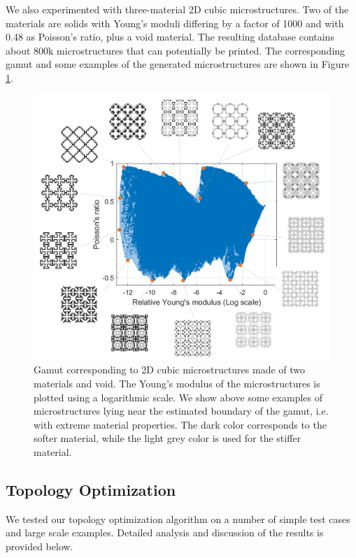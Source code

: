 We also experimented with three-material 2D cubic microstructures.
Two of the materials are solids with Young's moduli differing by a factor of 1000 and with 0.48 as Poisson's ratio, plus a void material.
The resulting database contains about 800k microstructures that can potentially be printed.
The corresponding gamut and some examples of the generated microstructures are shown in Figure \ref{fig:Cubic2D_3Materials}.
\begin{figure}
	\centering
	\includegraphics[width=.5\linewidth]{images/Cubic2D_3Materials.png}
	\caption{Gamut corresponding to 2D cubic microstructures made of two materials and void. The Young's modulus of the microstructures is plotted using a logarithmic scale. We show above some examples of microstructures lying near the estimated boundary of the gamut, i.e. with extreme material properties.
	The dark color corresponds to the softer material, while the light grey color is used for the stiffer material.}
	\label{fig:Cubic2D_3Materials}
\end{figure}
\subsection{Topology Optimization}
We tested our topology optimization algorithm on a number of simple test cases and large scale examples. Detailed analysis and discussion of the results is provided below.


